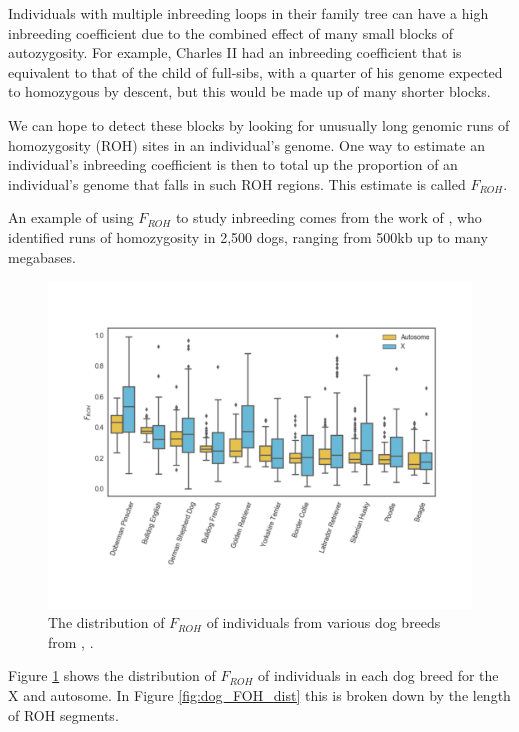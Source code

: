 Individuals with multiple inbreeding loops in their family tree can
have a high inbreeding coefficient due to
the combined effect of many small blocks of autozygosity. For example, Charles II had
an inbreeding coefficient that is equivalent to that of the child of
full-sibs, with a quarter of his genome expected to homozygous by
descent, but this would be made up of many shorter blocks.

We can hope to detect these blocks by looking for unusually long
genomic runs of homozygosity (ROH) sites in an individual's genome. One way to
estimate an individual's inbreeding coefficient is then to total up
the proportion of an individual's genome that falls in such ROH
regions. This estimate is called $F_{ROH}$.

An example of using $F_{ROH}$ to study inbreeding comes from the work of
\citet{sams2018fine}, who identified runs of homozygosity in 2,500 dogs,
ranging from 500kb up to many megabases.
  \begin{figure}
  \begin{center}
    \includegraphics[width= \textwidth]{figures/sharing_relatives/dogs_FROH.pdf}
\end{center}
\caption{The distribution  of $F_{ROH}$ of individuals from various
  dog breeds from \citet{Sams:18}, \PLOSccBY.} \label{fig:dog_FOH}
\end{figure}
Figure
\ref{fig:dog_FOH} shows the distribution of $F_{ROH}$ of individuals in each dog
breed for the X and autosome. In Figure \ref{fig:dog_FOH_dist} this is
broken down by the length of ROH segments.

